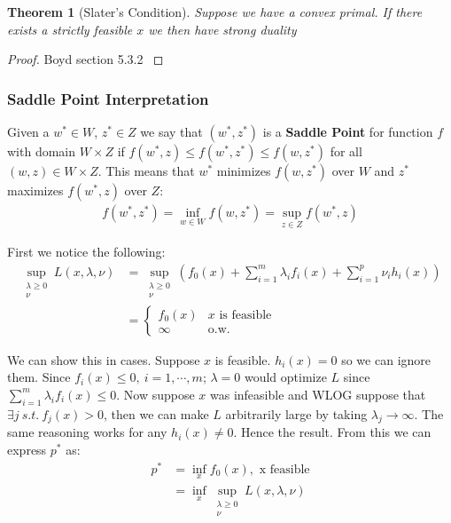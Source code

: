 \documentclass[]{article}
\theoremstyle{mattstyle}
\newtheorem{theorem}{Theorem}[section]
\theoremstyle{definition}
\begin{document}
\begin{theorem}[Slater's Condition]
	Suppose we have a convex primal. If there exists a strictly feasible $x$ we then have strong duality
\end{theorem}
\begin{proof}
	Boyd section 5.3.2 \cite{Boyd:2004:CO:993483}
\end{proof}

\subsubsection{Saddle Point Interpretation}

Given a $w^*\in W$, $z^*\in Z$ we say that $(w^*,z^*)$ is a \textbf{Saddle Point} for function $f$ with domain $W \times Z$ if $f(w^*, z) \le f(w^*, z^*) \le f(w, z^*)$ for all $(w,z) \in W \times Z$. This means that $w^*$ minimizes $f(w, z^*)$ over $W$ and $z^*$ maximizes $f(w^*, z)$ over $Z$:
\begin{align*}
f(w^*, z^*) = \inf_{w \in W} f(w, z^*) = \sup_{z \in Z} f(w^*, z)
\end{align*}

First we notice the following:
\begin{align*}
\sup\limits_{\substack{\lambda\ge0 \\ \nu}} L(x, \lambda, \nu) &= \sup\limits_{\substack{\lambda\ge0 \\ \nu}} \left( f_0(x) + \sum_{i=1}^m \lambda_if_i(x) + \sum_{i=1}^p \nu_i h_i(x) \right)\\
&= \begin{cases}
f_0(x) & \text{$x$ is feasible}\\
\infty & \text{o.w.}
\end{cases}
\end{align*}

We can show this in cases. Suppose $x$ is feasible. $h_i(x)=0$ so we can ignore them. Since $f_i(x) \le 0,\ i=1, \cdots, m$; $\lambda = 0$ would optimize $L$ since $\sum_{i=1}^m \lambda_if_i(x) \le 0$. Now suppose $x$ was infeasible and WLOG suppose that $ \exists j \ s.t.\ f_j(x) > 0$, then we can make $L$ arbitrarily large by taking $\lambda_j \rightarrow \infty$. The same reasoning works for any $h_i(x) \ne 0$. Hence the result. From this we can express $p^*$ as:
\begin{align*}
p^* &= \inf_x f_0(x), \text{  x feasible}\\
&= \inf_x\sup_{\substack{\lambda\ge0 \\ \nu}}L(x, \lambda, \nu)
\end{align*}
\end{document}
